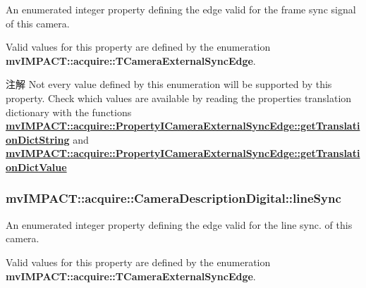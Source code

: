 An enumerated integer property defining the edge valid for the frame sync signal of this camera. 

Valid values for this property are defined by the enumeration {\bfseries mv\+I\+M\+P\+A\+C\+T\+::acquire\+::\+T\+Camera\+External\+Sync\+Edge}.

\begin{DoxyNote}{注解}
Not every value defined by this enumeration will be supported by this property. Check which values are available by reading the properties translation dictionary with the functions {\bfseries \hyperlink{classmv_i_m_p_a_c_t_1_1acquire_1_1_enum_property_i_af5ec5a9c3657af2917f4ead78ef067db}{mv\+I\+M\+P\+A\+C\+T\+::acquire\+::\+Property\+I\+Camera\+External\+Sync\+Edge\+::get\+Translation\+Dict\+String}} and {\bfseries \hyperlink{classmv_i_m_p_a_c_t_1_1acquire_1_1_enum_property_i_a0c50700ebff2806621c63d03b624f200}{mv\+I\+M\+P\+A\+C\+T\+::acquire\+::\+Property\+I\+Camera\+External\+Sync\+Edge\+::get\+Translation\+Dict\+Value}} 
\end{DoxyNote}
\hypertarget{classmv_i_m_p_a_c_t_1_1acquire_1_1_camera_description_digital_a777652c7193f75207a48601790a19762}{
\subsubsection[{line\+Sync}]{ mv\+I\+M\+P\+A\+C\+T\+::acquire\+::\+Camera\+Description\+Digital\+::line\+Sync}}\label{classmv_i_m_p_a_c_t_1_1acquire_1_1_camera_description_digital_a777652c7193f75207a48601790a19762}


An enumerated integer property defining the edge valid for the line sync. of this camera. 

Valid values for this property are defined by the enumeration {\bfseries mv\+I\+M\+P\+A\+C\+T\+::acquire\+::\+T\+Camera\+External\+Sync\+Edge}.

